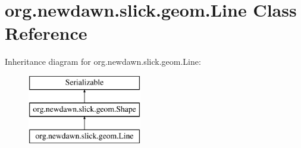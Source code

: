 \hypertarget{classorg_1_1newdawn_1_1slick_1_1geom_1_1_line}{}\section{org.\+newdawn.\+slick.\+geom.\+Line Class Reference}
\label{classorg_1_1newdawn_1_1slick_1_1geom_1_1_line}
Inheritance diagram for org.\+newdawn.\+slick.\+geom.\+Line\+:\begin{figure}[H]
\begin{center}
\leavevmode
\includegraphics[height=3.000000cm]{classorg_1_1newdawn_1_1slick_1_1geom_1_1_line}
\end{center}
\end{figure}
